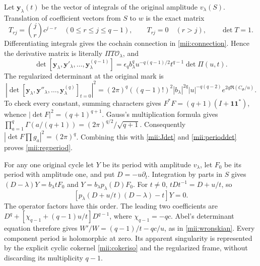 \documentclass[11pt]{article}
\begin{document}
Let $\mathbf y_\lambda(t)$ be the vector of integrals of the
original amplitude $v_\lambda(S)$. Translation of coefficient
vectors from $S$ to $w$ is the exact matrix
\[
 T_{rj}=\binom jr c^{j-r}\quad(0\le r\le j\le q-1),\qquad
 T_{rj}=0\quad(r>j),\qquad\det T=1.
\]
Differentiating integrals gives the cochain connection in
\eqref{mii:connection}. Hence the derivative matrix is literally
$\Pi T\mathcal O_\lambda$, and
\begin{equation}\tag{MII28}\label{mii:wronskian}
 \det[\mathbf y_\lambda,\mathbf y'_\lambda,\ldots,
                       \mathbf y^{(q-1)}_\lambda]
 =\epsilon_q b_\lambda^q u^{-q(q-1)/2}t^{q-1}\det\Pi(u,t).
\end{equation}
The regularized determinant at the original mark is
\begin{equation}\tag{MII29}\label{mii:regperiod}
 \left|\det[\mathbf y_\lambda,\mathbf y''_\lambda,\ldots,
                    \mathbf y_\lambda^{(q)}]_{t=0}\right|^2
 =(2\pi)^q((q-1)!)^2|b_\lambda|^{2q}
     |u|^{-q(q-2)}e^{2q\Re(C_\Phi/u)}.
\end{equation}
To check every constant, summing characters gives
$F^*F=(q+1)(I+\mathbf1\mathbf1^*)$, whence
$|\det F|^2=(q+1)^{q+1}$. Gauss's multiplication formula
\cite[(5.5.6)--(5.5.7)]{dlmf} gives
$\prod_{a=1}^q\Gamma(a/(q+1))=(2\pi)^{q/2}/\sqrt{q+1}$.
Consequently $|\det F\prod g_a|^2=(2\pi)^q$.
Combining this with \eqref{mii:Jdet} and
\eqref{mii:perioddet} proves \eqref{mii:regperiod}.

For any one original cycle let $Y$ be its period with amplitude
$v_\lambda$, let $F_0$ be its period with amplitude one, and
put $D=-u\partial_t$. Integration by parts in $S$ gives
$(D-\lambda)Y=b_\lambda tF_0$ and
$Y=b_\lambda p_\lambda(D)F_0$. For $t\ne0$,
$tDt^{-1}=D+u/t$, so
\begin{equation}\tag{MII30}\label{mii:scalar}
 [p_\lambda(D+u/t)(D-\lambda)-t]Y=0.
\end{equation}
The operator factors have this order. The leading two coefficients
are $D^q+[\chi_{q-1}+(q-1)u/t]D^{q-1}$, where
$\chi_{q-1}=-qc$. Abel's determinant equation therefore gives
$W'/W=(q-1)/t-qc/u$, as in \eqref{mii:wronskian}.
Every component period is holomorphic at zero. Its apparent
singularity is represented by the explicit cyclic cokernel
\eqref{mii:cokeriso} and the regularized frame, without discarding
its multiplicity $q-1$.
\end{document}
